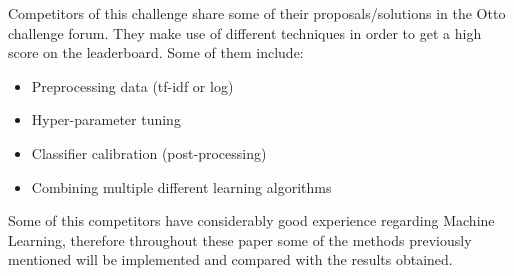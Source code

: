 Competitors of this challenge share some of their proposals/solutions in the Otto challenge forum. They make use of different techniques in order to get a high score on the leaderboard. Some of them include:
\begin{itemize}
	\item Preprocessing data (tf-idf or log)
	\item Hyper-parameter tuning
	\item Classifier calibration (post-processing)
	\item Combining multiple different learning algorithms
\end{itemize} 

Some of this competitors have considerably good experience regarding Machine Learning, therefore throughout these paper some of the methods previously mentioned will be implemented and compared with the results obtained.
